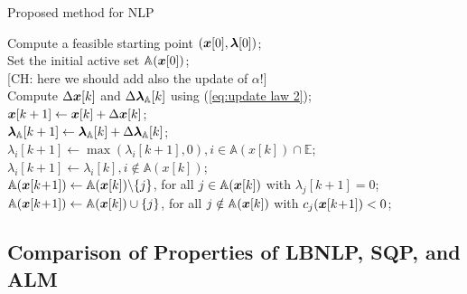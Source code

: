 \documentclass[journal]{IEEEtranTIE}
\newtheorem{remark}{Remark}
\newcommand{\CHHA}[1]{{\color{red} [CH: #1]}} %
\begin{document}

\begin{algorithm}[!t]
\caption{Proposed method for NLP} 
\label{alg1}
Compute a feasible starting point $(\boldsymbol{x}[0],\boldsymbol{\lambda}[0])$;\\
Set the initial active set $\mathbb{A}(\boldsymbol{x}[0])$; \\
\CHHA{here we should add also the update of $\alpha$!}\\
{
    Compute $\Delta\boldsymbol{x}[k]$ and $\Delta\boldsymbol{\lambda}_{\mathbb{A}}[k]$ using (\ref{eq:update law 2}); \\
    $\boldsymbol{x}[k + 1] \leftarrow \boldsymbol{x}[k] + \Delta\boldsymbol{x}[k]$;\\
    $\boldsymbol{\lambda}_{\mathbb{A}}[k + 1] \leftarrow {\boldsymbol{\lambda}_{\mathbb{A}}[k]} + {\Delta\boldsymbol{\lambda}_{\mathbb{A}}[k]}$;\\
    $\lambda_i[k + 1] \leftarrow \max(\lambda_i[k\!+\!1],0), i \in \mathbb{A}(x[k]) \cap \mathbb{E}$;\\
    $\lambda_i[k + 1] \leftarrow \lambda _{i}[k], i \notin \mathbb{A}(x[k])$;\\
    $\mathbb{A}(\boldsymbol{x}[k\!+\!1]) \leftarrow \mathbb{A}(\boldsymbol{x}[k]) \backslash \{j\}$, for all $j \in \mathbb{A}(\boldsymbol{x}[k])$ with $\lambda_j[k\!+\!1] = 0$;\\ %
    $\mathbb{A}(\boldsymbol{x}[k\!+\!1]) \leftarrow \mathbb{A}(\boldsymbol{x}[k]) \cup \{j\}$, for all $j \notin \mathbb{A}(\boldsymbol{x}[k])$ with $c_j(\boldsymbol{x}[k\!+\!1]) < 0$;\\ %
 }
\end{algorithm}

\subsection{Comparison of Properties of LBNLP, SQP, and ALM}
\label{subsec:prop}
\end{document}
